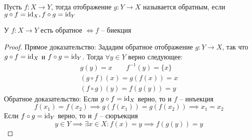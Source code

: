 \documentclass[main]{subfiles}
\begin{document}
\begin{definition}
    Пусть $f: X \to Y$, тогда отображение $g: Y \to X$ называется обратным, если
    $g\circ f = \mathrm{id}_X, f \circ g = \mathrm{id}_Y$
\end{definition}

\begin{theorem}
    У $f: X \to Y$ есть обратное $\Leftrightarrow f $ -- биекция
\end{theorem}
\begin{proof}
    Прямое доказательство:
    Зададим обратное отображение $g: Y \to X$, так что $g\circ f  = \mathrm{id}_X$ и $f\circ g  = \mathrm{id}_Y$.
    Тогда $\forall y \in Y$ верно следующее:
    \begin{gather*}
        g(y) = x \qquad f^{-1}(y) = \{x\}\\
        (g \circ f) (x) = g(f(x)) = x\\
        (f \circ g) (y) = f(g(y)) = y
    \end{gather*}
    Обратное доказательство:
    Если $g\circ f = \mathrm{id}_X$ верно, то и $f$ -- инъекция
    \[f(x_1) = f(x_2) \implies g(f(x_1)) = g(f(x_2)) \implies x_1 = x_2\]
    Если $f \circ g  = \mathrm{id}_Y$ верно, то и $f$ -- сюръекция
    \[y \in Y \implies \exists x \in X: f(x)=y \implies f(g(y)) =y \]
\end{proof}
\end{document}
